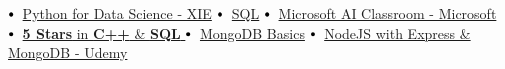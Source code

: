 \documentclass[letterpaper,11pt]{article}
\newcommand\sbullet[1][.5]{\mathbin{\vcenter{\hbox{\scalebox{#1}{$\bullet$}}}}}
\begin{document}
$\sbullet[.75] \hspace{0.2cm}${\href{certificateLink.com}{Python for Data Science - XIE}} \hspace{1cm}
$\sbullet[.75] \hspace{0.1cm}$ {\href{certificateLink.com}{SQL}} \hspace{2.6cm}
$\sbullet[.75] \hspace{0.2cm}${\href{certificateLink.com}{Microsoft AI Classroom - Microsoft}} \\

$\sbullet[.75] \hspace{0.2cm}${\href{certificateLink.com}{\textbf{5 Stars} in \textbf{C++} \& \textbf{SQL} \href{certificateLink.com}{\raisebox{-0.1\height}\faExternalLink }}}\hspace{1.45cm}
$\sbullet[.75] \hspace{0.2cm}${\href{certificateLink.com}{MongoDB Basics}} \hspace{0.5cm}
$\sbullet[.75] \hspace{0.2cm}${\href{certificateLink.com}{NodeJS with Express \& MongoDB - Udemy}} \\
\end{document}
